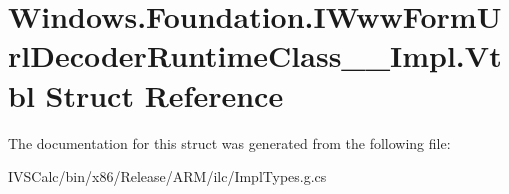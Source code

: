 \hypertarget{struct_windows_1_1_foundation_1_1_i_www_form_url_decoder_runtime_class_____impl_1_1_vtbl}{}\section{Windows.\+Foundation.\+I\+Www\+Form\+Url\+Decoder\+Runtime\+Class\+\_\+\+\_\+\+Impl.\+Vtbl Struct Reference}
\label{struct_windows_1_1_foundation_1_1_i_www_form_url_decoder_runtime_class_____impl_1_1_vtbl}


The documentation for this struct was generated from the following file\+:\begin{DoxyCompactItemize}
\item 
I\+V\+S\+Calc/bin/x86/\+Release/\+A\+R\+M/ilc/Impl\+Types.\+g.\+cs\end{DoxyCompactItemize}

